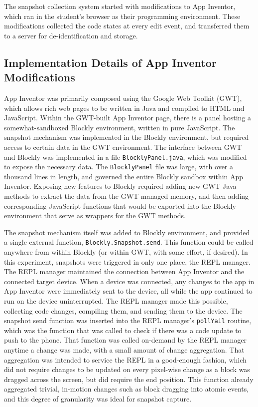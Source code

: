 The snapshot collection system started with modifications to App Inventor, which ran in the student's browser as their programming environment. These modifications collected the code states at every edit event, and transferred them to a server for de-identification and storage. 

\subsection{Implementation Details of App Inventor Modifications}
\label{sub:tech:ai}
App Inventor was primarily composed using the Google Web Toolkit (GWT), which allows rich web pages to be written in Java and compiled to HTML and JavaScript. Within the GWT-built App Inventor page, there is a panel hosting a somewhat-sandboxed Blockly environment, written in pure JavaScript. The snapshot mechanism was implemented in the Blockly environment, but required access to certain data in the GWT environment. The interface between GWT and Blockly was implemented in a file \texttt{BlocklyPanel.java}, which was modified to expose the necessary data. The \texttt{BlocklyPanel} file was large, with over a thousand lines in length, and governed the entire Blockly sandbox within App Inventor. Exposing new features to Blockly required adding new GWT Java methods to extract the data from the GWT-managed memory, and then adding corresponding JavaScript functions that would be exported into the Blockly environment that serve as wrappers for the GWT methods. 

The snapshot mechanism itself was added to Blockly environment, and provided a single external function, \texttt{Blockly.Snapshot.send}. This function could be called anywhere from within Blockly (or within GWT, with some effort, if desired). In this experiment, snapshots were triggered in only one place, the REPL manager. The REPL manager maintained the connection between App Inventor and the connected target device. When a device was connected, any changes to the app in App Inventor were immediately sent to the device, all while the app continued to run on the device uninterrupted. The REPL manager made this possible, collecting code changes, compiling them, and sending them to the device. The snapshot send function was inserted into the REPL manager's \texttt{pollYail} routine, which was the function that was called to check if there was a code update to push to the phone. That function was called on-demand by the REPL manager anytime a change was made, with a small amount of change aggregation. That aggregation was intended to service the REPL in a good-enough fashion, which did not require changes to be updated on every pixel-wise change as a block was dragged across the screen, but did require the end position. This function already aggregated trivial, in-motion changes such as block dragging into atomic events, and this degree of granularity was ideal for snapshot capture. 

